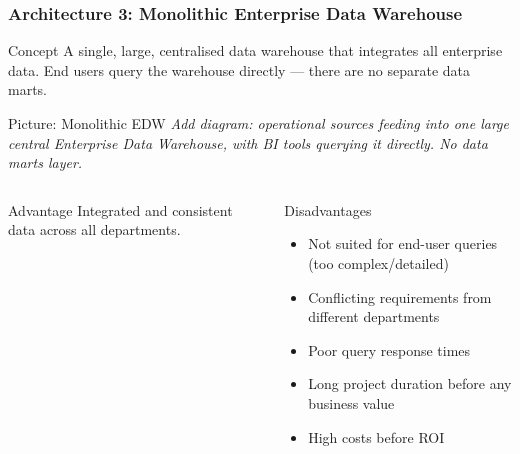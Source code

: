 
\begin{frame}
  \frametitle{Architecture 3: Monolithic Enterprise Data Warehouse}

  \begin{block}{Concept}
    A single, large, centralised data warehouse that integrates all enterprise
    data. End users query the warehouse directly --- there are no separate
    data marts.
  \end{block}

  \begin{alertblock}{Picture: Monolithic EDW}
    \textit{Add diagram: operational sources feeding into one large
    central Enterprise Data Warehouse, with BI tools querying it directly.
    No data marts layer.}
  \end{alertblock}

  \begin{columns}[T]
    \begin{block}{Advantage}
      Integrated and consistent data across all departments.
    \end{block}

    \begin{alertblock}{Disadvantages}
      \begin{itemize}
        \item Not suited for end-user queries (too complex/detailed)
        \item Conflicting requirements from different departments
        \item Poor query response times
        \item Long project duration before any business value
        \item High costs before ROI
      \end{itemize}
    \end{alertblock}
  \end{columns}
\end{frame}


